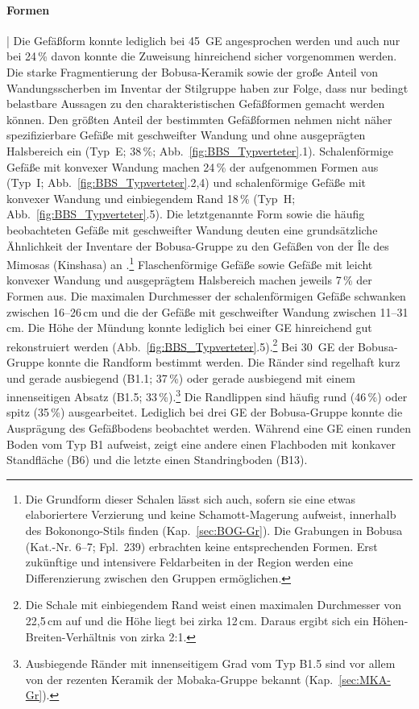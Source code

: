 \paragraph{Formen}\hspace{-.5em}|\hspace{.5em}%
Die Gefäßform konnte lediglich bei 45~GE angesprochen werden und auch nur bei 24\,\% davon konnte die Zuweisung hinreichend sicher vorgenommen werden. Die starke Fragmentierung der Bobusa-Keramik sowie der große Anteil von Wandungsscherben im Inventar der Stilgruppe haben zur Folge, dass nur bedingt belastbare Aussagen zu den charakteristischen Gefäßformen gemacht werden können. Den größten Anteil der bestimmten Gefäßformen nehmen nicht näher spezifizierbare Gefäße mit geschweifter Wandung und ohne ausgeprägten Halsbereich ein (Typ~E; 38\,\%; Abb.~\ref{fig:BBS_Typverteter}.1). Schalenförmige Gefäße mit konvexer Wandung machen 24\,\% der aufgenommen Formen aus (Typ~I; Abb.~\ref{fig:BBS_Typverteter}.2,4) und schalenförmige Gefäße mit konvexer Wandung und einbiegendem Rand 18\,\% (Typ~H; Abb.~\ref{fig:BBS_Typverteter}.5). Die letztgenannte Form sowie die häufig beobachteten Gefäße mit geschweifter Wandung deuten eine grundsätzliche Ähnlichkeit der Inventare der Bobusa-Gruppe zu den Gefäßen von der Île des Mimosas (Kinshasa) an \parencite[siehe][279f.; Kap.~\ref{sec:Niederkongo}]{Eggert.1984}.\footnote{Die Grundform dieser Schalen lässt sich auch, sofern sie eine etwas elaboriertere Verzierung und keine Schamott-Magerung aufweist, innerhalb des Bokonongo-Stils finden (Kap.~\ref{sec:BOG-Gr}). Die Grabungen in Bobusa (Kat.-Nr. 6--7; Fpl.~239) erbrachten keine entsprechenden Formen. Erst zukünftige und intensivere Feldarbeiten in der Region werden eine Differenzierung zwischen den Gruppen ermöglichen.} Flaschenförmige Gefäße sowie Gefäße mit leicht konvexer Wandung und ausgeprägtem Halsbereich machen jeweils 7\,\% der Formen aus. Die maximalen Durchmesser der schalenförmigen Gefäße schwanken zwischen \mbox{16--26\,cm} und die der Gefäße mit geschweifter Wandung zwischen 11--31\,cm. Die Höhe der Mündung konnte lediglich bei einer GE hinreichend gut rekonstruiert werden (Abb.~\ref{fig:BBS_Typverteter}.5).\footnote{Die Schale mit einbiegendem Rand weist einen maximalen Durchmesser von 22,5\,cm auf und die Höhe liegt bei zirka 12\,cm. Daraus ergibt sich ein Höhen-Breiten-Verhältnis von zirka 2:1.} Bei 30~GE der Bobusa-Gruppe konnte die Randform bestimmt werden. Die Ränder sind regelhaft kurz und gerade ausbiegend (B1.1; 37\,\%) oder gerade ausbiegend mit einem innenseitigen Absatz (B1.5; 33\,\%).\footnote{Ausbiegende Ränder mit innenseitigem Grad vom Typ B1.5 sind vor allem von der rezenten Keramik der Mobaka-Gruppe bekannt (Kap.~\ref{sec:MKA-Gr}).} Die Randlippen sind häufig rund (46\,\%) oder spitz (35\,\%) ausgearbeitet. Lediglich bei drei GE der Bobusa-Gruppe konnte die Ausprägung des Gefäßbodens beobachtet werden. Während eine GE einen runden Boden vom Typ B1 aufweist, zeigt eine andere einen Flachboden mit konkaver Standfläche (B6) und die letzte einen Standringboden (B13).

